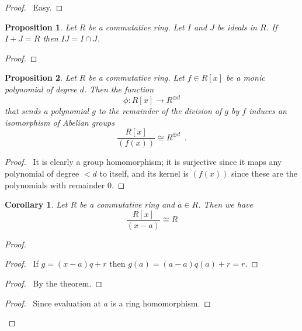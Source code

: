\documentclass{book}
\let\qed\relax
\newtheorem{prop}{Proposition}[chapter]
\newtheorem{cor}{Corollary}[prop]
\theoremstyle{definition}
\begin{document}
\begin{proof}
\pf\ Easy. \qed
\end{proof}

\begin{prop}
Let $R$ be a commutative ring. Let $I$ and $J$ be ideals in $R$. If $I + J = R$ then $IJ = I \cap J$.
\end{prop}

\begin{proof}
\pf
{}
\qed
\end{proof}

\begin{prop}
Let $R$ be a commutative ring. Let $f \in R[x]$ be a monic polynomial of degree $d$. Then the function
\[ \phi : R[x] \rightarrow R^{\oplus d} \]
that sends a polynomial $g$ to the remainder of the division of $g$ by $f$ induces an isomorphism of Abelian groups
\[ \frac{R[x]}{(f(x))} \cong R^{\oplus d} \enspace . \]
\end{prop}

\begin{proof}
\pf\ It is clearly a group homomorphism; it is surjective since it maps any polynomial of degree $< d$ to itself, and its kernel is $(f(x))$ since these are the polynomials with remainder 0. \qed
\end{proof}

\begin{cor}
Let $R$ be a commutative ring and $a \in R$. Then we have
\[ \frac{R[x]}{(x-a)} \cong R \]
\end{cor}

\begin{proof}
\pf
{}
\begin{proof}
\pf\ If $g = (x-a)q + r$ then $g(a) = (a-a)q(a) + r = r$.
\end{proof}
\begin{proof}
\pf\ By the theorem.
\end{proof}
\begin{proof}
\pf\ Since evaluation at $a$ is a ring homomorphism.
\end{proof}
\qed
\end{proof}
\end{document}
